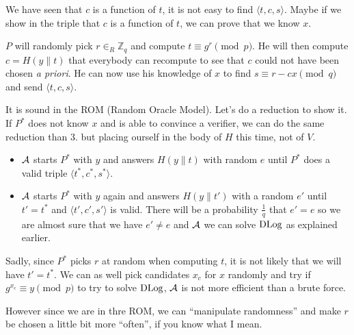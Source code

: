 \begin{solution}
\begin{enumerate}
      We have seen that $c$ is a function of $t$,
      it is not easy to find $\langle t,c,s \rangle$.
      Maybe if we show in the triple that $c$ is a function of $t$,
      we can prove that we know $x$.

      $P$ will randomly pick $r \in_R \mathbb{Z}_q$ and compute $t \equiv g^r \pmod{p}$.
      He will then compute $c = H(y\|t)$ that everybody can recompute to see that $c$ could not have been chosen \emph{a priori}.
      He can now use his knowledge of $x$ to find $s \equiv r - cx \pmod{q}$ and send $\langle t, c, s \rangle$.

      It is sound in the ROM (Random Oracle Model).
      Let's do a reduction to show it.
      If $P^*$ does not know $x$ and is able to convince a verifier,
      we can do the same reduction than 3. but placing ourself in the body of $H$ this time, not of $V$.
      \begin{itemize}
        \item $\mathcal{A}$ starts $P^*$ with $y$ and answers $H(y\|t)$ with random $e$ until $P^*$ does a valid triple $\langle t^*,c^*,s^* \rangle$.
        \item $\mathcal{A}$ starts $P^*$ with $y$ again and answers $H(y\|t')$ with a random $e'$ until $t' = t^*$ and $\langle t',c',s' \rangle$ is valid.
          There will be a probability $\frac{1}{q}$ that $e' = e$ so we are almost sure that we have $e' \neq e$
          and $\mathcal{A}$ we can solve $\operatorname{DLog}$ as explained earlier.
      \end{itemize}
      Sadly, since $P^*$ picks $r$ at random when computing $t$, it is not likely that we will have $t' = t^*$.
      We can as well pick candidates $x_c$ for $x$ randomly and try if $g^{x_c} \equiv y \pmod{p}$ to try to solve $\operatorname{DLog}$,
      $\mathcal{A}$ is not more efficient than a brute force.

      However since we are in thre ROM, we can ``manipulate randomness'' and make $r$ be chosen a little bit more ``often'',
      if you know what I mean.
  \end{enumerate}
\end{solution}

